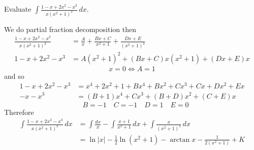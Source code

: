 \begin{enumerate}
\begin{problem}
        Evaluate \(\displaystyle{\int\frac{1-x+2x^2-x^3}{x(x^2+1)^2}\,dx}\).
    \end{problem}
    \begin{solution}
        We do partial fraction decomposition then
        \begin{align*}
            \frac{1-x+2x^2-x^3}{x(x^2+1)^2}
            &= \frac{A}{x}+\frac{Bx+C}{x^2+1}+\frac{Dx+E}{(x^2+1)^2} \\
            1-x+2x^2-x^3 &= A(x^2+1)^2+(Bx+C)x(x^2+1)+(Dx+E)x
        \end{align*}
        \[x=0\iff A=1\]
        and so
        \begin{align*}
            1-x+2x^2-x^3 &= x^4+2x^2+1+Bx^4+Bx^2+Cx^3+Cx+Dx^2+Ex \\
            -x-x^3 &= (B+1)x^4+Cx^3+(B+D)x^2+(C+E)x
        \end{align*}
        \[\quad B=-1\quad C=-1\quad D=1\quad E=0\]
        Therefore
        \begin{align*}
            \int\frac{1-x+2x^2-x^3}{x(x^2+1)^2}\,dx
            &= \int\frac{dx}{x}-\int\frac{x+1}{x^2+1}\,dx
            +\int\frac{x}{(x^2+1)^2}\,dx \\
            &= \ln|x|-\frac{1}{2}\ln(x^2+1)-\arctan x
            -\frac{1}{2(x^2+1)}+K
        \end{align*}
    \end{solution}
\end{enumerate}